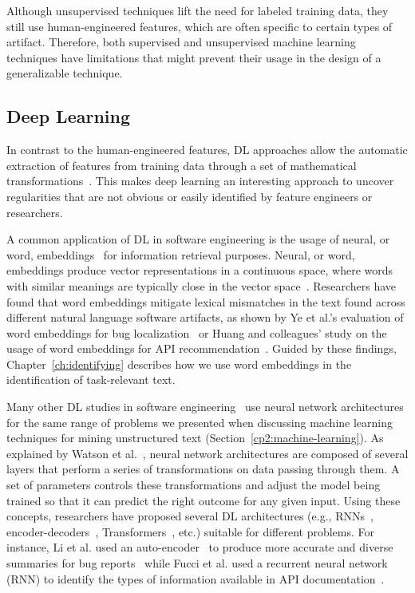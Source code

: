 Although unsupervised techniques lift the need for labeled training data,
they still use human-engineered features, 
which are often specific to certain 
types of artifact. Therefore, 
both supervised and unsupervised machine learning techniques
have limitations that might prevent their usage 
in the design of a generalizable technique.




\subsection{Deep Learning }
\label{cp2:deep-learning}



In contrast to the human-engineered features,
\acf{DL} approaches allow the automatic extraction of features 
from training data through a set of mathematical transformations~\cite{Deng2018, zhang2021deep}.
This makes 
deep learning an interesting 
approach to
uncover regularities 
that are not obvious or easily identified
by feature engineers or researchers.



A common application of \acs{DL} in software engineering is the usage of neural, or word, embeddings~\cite{Mikolov2013}
for information retrieval purposes. 
Neural, or word, embeddings produce vector representations in a continuous space,
where words with similar meanings are typically close in the vector space~\cite{harris1954distributional, mikolov2013efficient}. 
Researchers have found that word
embeddings mitigate lexical mismatches in the text found across different 
natural language software artifacts,
as shown by Ye et al.'s evaluation of word embeddings
for bug localization~\cite{Ye2016}
or Huang and colleagues' study on 
the usage of word embeddings for API recommendation~\cite{Huang2018}.
Guided by these findings, Chapter~\ref{ch:identifying} describes 
how we use word embeddings in the identification 
of task-relevant text.



Many other \acs{DL} studies in software engineering~\cite{ferreira2021,li2018deep}
use neural network architectures 
for the same range of problems we presented when discussing machine learning techniques for mining unstructured text (Section~\ref{cp2:machine-learning}).
As explained by Watson et al.~\cite{watson2022},
neural network architectures are composed of several layers 
that perform a series of transformations on data passing through them. 
A set of parameters controls these transformations and 
adjust the model being trained so that it can predict 
the right outcome for any given input.
Using these concepts, researchers have proposed 
several  \acs{DL} architectures (e.g., \acs{RNN}s~\cite{rumelhart1986rnn, sutskever2014seq2seq}, encoder-decoders~\cite{bahdanau2014neural}, Transformers~\cite{Vaswani2017attention}, etc.) 
suitable for different problems. 
For instance,
Li et al. used an auto-encoder~\cite{liou2014autoencoder}
to produce more accurate and diverse summaries 
for bug reports~\cite{li2018deep} while 
Fucci et al. used a 
recurrent neural network (\acs{RNN}) 
to identify the types of information available in 
API documentation~\cite{fucci2019}.

